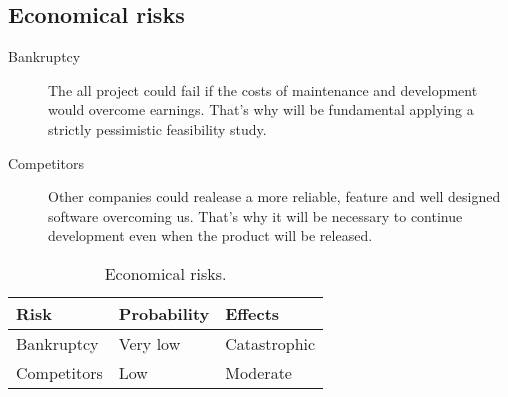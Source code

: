 \subsection{Economical risks}


\begin{description}
    \item[Bankruptcy] The all project could fail if the costs of maintenance and development would overcome earnings.
    That's why will be fundamental applying a strictly pessimistic feasibility study.

    \item[Competitors] Other companies could realease a more reliable, feature and well designed software overcoming us. That's why it will be necessary to continue development even when the product will be released.
\end{description}

\begin{table}[!htbp]
\centering
    \begin{tabular}{| l | l | l |}
        \hline
        \textbf{Risk}       & \textbf{Probability}  & \textbf{Effects}  \\
        \hline
        Bankruptcy          & Very low             & Catastrophic      \\
        \hline
        Competitors         & Low              & Moderate            \\
        \hline
    \end{tabular}
    \caption{Economical risks.}
    \label{tab:economical-risks}
\end{table}